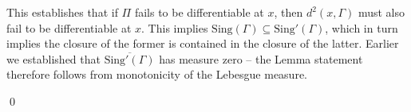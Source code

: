 \documentclass[11pt]{article}
\begin{document}
This establishes that if $\Pi$ fails to be differentiable at $x$, then $d^2(x, \Gamma)$ must also fail to be differentiable at $x$. This implies $\text{Sing}(\Gamma) \subseteq \text{Sing}'(\Gamma)$, which in turn implies the closure of the former is contained in the closure of the latter. Earlier we established that $\overline{\text{Sing}'(\Gamma)}$ has measure zero -- the Lemma statement therefore follows from monotonicity of the Lebesgue measure.

\qed{}



\end{document}
